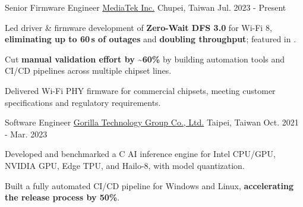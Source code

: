 

\begin{cventries}

  \cventry
    {Senior Firmware Engineer} %
    {\href{https://www.mediatek.com/}{MediaTek Inc.}} %
    {Chupei, Taiwan} %
    {Jul. 2023 - Present} %
    {
      \begin{cvitems} %
        \item {Led driver \& firmware development of \textbf{Zero-Wait DFS 3.0} for Wi-Fi 8, \textbf{eliminating up to 60\,s of outages} and \textbf{doubling throughput}; featured in \href{https://www.mediatek.com/hubfs/Pioneering\%20the\%20Wi-Fi\%208\%20Ecosystem\%5F\%20Extending\%20Reliability\%20Gains\%20Across\%20Wi-Fi\%207\%20and\%20Wi-Fi\%206\%20Devices.pdf}{}.}
        \item {Cut \textbf{manual validation effort by \textasciitilde60\%} by building automation tools and CI/CD pipelines across multiple chipset lines.}
        \item {Delivered Wi-Fi PHY firmware for commercial chipsets, meeting customer specifications and regulatory requirements.}
      \end{cvitems}
    }

  \cventry
    {Software Engineer} %
    {\href{https://www.gorilla-technology.com/}{Gorilla Technology Group Co., Ltd.}} %
    {Taipei, Taiwan} %
    {Oct. 2021 - Mar. 2023} %
    {
      \begin{cvitems} %
        \item {Developed and benchmarked a C AI inference engine for Intel CPU/GPU, NVIDIA GPU, Edge TPU, and Hailo-8, with model quantization.}
        \item {Built a fully automated CI/CD pipeline for Windows and Linux, \textbf{accelerating the release process by 50\%}.}
      \end{cvitems}
    }

\end{cventries}
